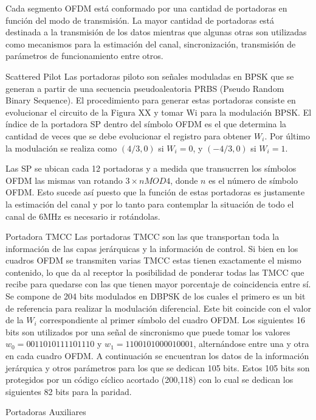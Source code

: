 Cada segmento OFDM está conformado por una cantidad de portadoras en función del modo de transmisión. La mayor cantidad de portadoras está destinada a la transmisión de los datos mientras que algunas otras son utilizadas como mecanismos para la estimación del canal, sincronización, transmisión de parámetros de funcionamiento entre otros.



Scattered Pilot
Las portadoras piloto son señales moduladas en BPSK que se generan a partir de una secuencia pseudoaleatoria PRBS (Pseudo Random Binary Sequence). El procedimiento para generar estas portadoras consiste en evolucionar el circuito de la Figura XX y tomar Wi para la modulación BPSK. El índice de la portadora SP dentro del símbolo OFDM es el que determina la cantidad de veces que se debe evolucionar el registro para obtener $W_i$.
Por último la modulación se realiza como $(4/3, 0)$ si $W_i = 0$, y $(-4/3, 0)$ si $W_i = 1$.

Las SP se ubican cada 12 portadoras y a medida que transucrren los símbolos OFDM las mismas van rotando $3 \times n MOD 4$, donde $n$ es el número de símbolo OFDM. Esto sucede así puesto que la función de estas portadoras es justamente la estimación del canal y por lo tanto para contemplar la situación de todo el canal de 6MHz es necesario ir rotándolas. 



Portadora TMCC
Las portadoras TMCC son las que transportan toda la información de las capas jerárquicas y la información de control. Si bien en los cuadros OFDM se transmiten varias TMCC estas tienen exactamente el mismo contenido, lo que da al receptor la posibilidad de ponderar todas las TMCC que recibe para quedarse con las que tienen mayor porcentaje de coincidencia entre sí.
Se compone de 204 bits modulados en DBPSK de los cuales el primero es un bit de referencia para realizar la modulación diferencial. Este bit coincide con el valor de la $W_i$ correspondiente al primer símbolo del cuadro OFDM.
Los siguientes 16 bits son utilizados por una señal de sincronismo que puede tomar los valores $w_0 = 0011010111101110$ y $w_1 = 1100101000010001$, alternándose entre una y otra en cada cuadro OFDM.
A continuación se encuentran los datos de la información jerárquica y otros parámetros para los que se dedican 105 bits. Estos 105 bits son protegidos por un código cíclico acortado (200,118) con lo cual se dedican los siguientes 82 bits para la paridad. 
  
Portadoras Auxiliares


